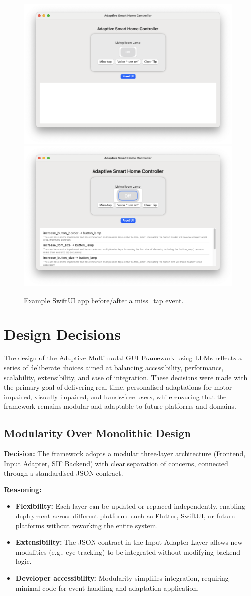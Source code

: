 \documentclass[openany]{book}
\begin{document}
\begin{figure}[h]
\centering
\includegraphics[width=.5\linewidth]{images/fig_swift_before.png}\hfill
\includegraphics[width=.5\linewidth]{images/fig_swift_after.png}
\caption{Example SwiftUI app before/after a miss\_tap event.}
\label{fig:swift-adapt}
\end{figure}

\section{Design Decisions}
The design of the Adaptive Multimodal GUI Framework using LLMs reflects a series of deliberate choices aimed at balancing accessibility, performance, scalability, extensibility, and ease of integration. These decisions were made with the primary goal of delivering real-time, personalised adaptations for motor-impaired, visually impaired, and hands-free users, while ensuring that the framework remains modular and adaptable to future platforms and domains.

\subsection{Modularity Over Monolithic Design}
\textbf{Decision:} The framework adopts a modular three-layer architecture (Frontend, Input Adapter, SIF Backend) with clear separation of concerns, connected through a standardised JSON contract.

\textbf{Reasoning:}
\begin{itemize}
    \item \textbf{Flexibility:} Each layer can be updated or replaced independently, enabling deployment across different platforms such as Flutter, SwiftUI, or future platforms without reworking the entire system.
    \item \textbf{Extensibility:} The JSON contract in the Input Adapter Layer allows new modalities (e.g., eye tracking) to be integrated without modifying backend logic.
    \item \textbf{Developer accessibility:} Modularity simplifies integration, requiring minimal code for event handling and adaptation application.
\end{itemize}
\end{document}
